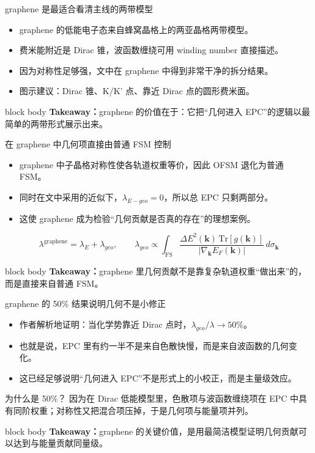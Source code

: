 \documentclass[aspectratio=169,11pt,UTF8]{ctexbeamer}
\newcommand{\takeaway}[1]{%
  \vfill
  \begin{beamercolorbox}[wd=\textwidth,sep=0.7ex,rounded=true]{block body}
    \small\textbf{Takeaway：}#1
  \end{beamercolorbox}
}
\begin{document}
\begin{frame}[fragile]{graphene 是最适合看清主线的两带模型}
  \begin{itemize}
    \item graphene 的低能电子态来自蜂窝晶格上的两亚晶格两带模型。
    \item 费米能附近是 Dirac 锥，波函数缠绕可用 winding number 直接描述。
    \item 因为对称性足够强，文中在 graphene 中得到非常干净的拆分结果。
  \item 图示建议：Dirac 锥、K/K' 点、靠近 Dirac 点的圆形费米面。
  \end{itemize}
  \takeaway{graphene 的价值在于：它把“几何进入 EPC”的逻辑以最简单的两带形式展示出来。}
\end{frame}

\begin{frame}[fragile]{在 graphene 中几何项直接由普通 FSM 控制}
  \begin{itemize}
    \item graphene 中子晶格对称性使各轨道权重等价，因此 OFSM 退化为普通 FSM。
    \item 同时在文中采用的近似下，$\lambda_{E-geo}=0$，所以总 EPC 只剩两部分。
    \item 这使 graphene 成为检验“几何贡献是否真的存在”的理想案例。
  \end{itemize}
  \begin{equation*}
    \lambda^{\mathrm{graphene}}
    =
    \lambda_E + \lambda_{geo},
    \qquad
    \lambda_{geo}
    \propto
    \int_{\mathrm{FS}}
    \frac{\Delta E^2(\mathbf{k}) \, \mathrm{Tr}[g(\mathbf{k})]}
         {|\nabla_{\mathbf{k}} E_F(\mathbf{k})|}
    \, d\sigma_{\mathbf{k}}
  \end{equation*}
  \takeaway{graphene 里几何贡献不是靠复杂轨道权重“做出来”的，而是直接来自普通 FSM。}
\end{frame}

\begin{frame}[fragile]{graphene 的 50\% 结果说明几何不是小修正}
  \begin{itemize}
    \item 作者解析地证明：当化学势靠近 Dirac 点时，$\lambda_{geo}/\lambda \to 50\%$。
    \item 也就是说，EPC 里有约一半不是来自色散快慢，而是来自波函数的几何变化。
    \item 这已经足够说明“几何进入 EPC”不是形式上的小校正，而是主量级效应。
  \end{itemize}
  \begin{block}{为什么是 50\%？}
    因为在 Dirac 低能模型里，色散项与波函数缠绕项在 EPC 中具有同阶权重；对称性又把混合项压掉，于是几何项与能量项并列。
  \end{block}
  \takeaway{graphene 的关键价值，是用最简洁模型证明几何贡献可以达到与能量贡献同量级。}
\end{frame}
\end{document}
